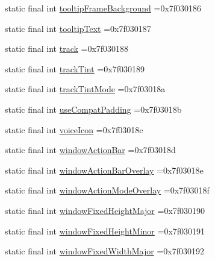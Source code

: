 \begin{DoxyCompactItemize}
\item 
static final int \mbox{\hyperlink{classbr_1_1unb_1_1cic_1_1mp_1_1marketmaster_1_1R_1_1attr_ae3aed9911de8e3c47c1885e8db3a3f1c}{tooltip\+Frame\+Background}} =0x7f030186
\item 
static final int \mbox{\hyperlink{classbr_1_1unb_1_1cic_1_1mp_1_1marketmaster_1_1R_1_1attr_a531b0326ef17c24a0771927cf2b5b775}{tooltip\+Text}} =0x7f030187
\item 
static final int \mbox{\hyperlink{classbr_1_1unb_1_1cic_1_1mp_1_1marketmaster_1_1R_1_1attr_ac1260a2b26abc0b62252a76fcb26e799}{track}} =0x7f030188
\item 
static final int \mbox{\hyperlink{classbr_1_1unb_1_1cic_1_1mp_1_1marketmaster_1_1R_1_1attr_a2a36e9079949feb5dbd0d19c1a49a868}{track\+Tint}} =0x7f030189
\item 
static final int \mbox{\hyperlink{classbr_1_1unb_1_1cic_1_1mp_1_1marketmaster_1_1R_1_1attr_aa15d3dab8bd8c47572e705b31a6fd0cb}{track\+Tint\+Mode}} =0x7f03018a
\item 
static final int \mbox{\hyperlink{classbr_1_1unb_1_1cic_1_1mp_1_1marketmaster_1_1R_1_1attr_a6e539db7f55699a9367e6ddb46f08a3c}{use\+Compat\+Padding}} =0x7f03018b
\item 
static final int \mbox{\hyperlink{classbr_1_1unb_1_1cic_1_1mp_1_1marketmaster_1_1R_1_1attr_ada4b1fd77a416c482745c94e9c4884f0}{voice\+Icon}} =0x7f03018c
\item 
static final int \mbox{\hyperlink{classbr_1_1unb_1_1cic_1_1mp_1_1marketmaster_1_1R_1_1attr_a5e8f80ddff8b8787ba37bed09668c60d}{window\+Action\+Bar}} =0x7f03018d
\item 
static final int \mbox{\hyperlink{classbr_1_1unb_1_1cic_1_1mp_1_1marketmaster_1_1R_1_1attr_a2a9e56491a8b8db8b531f47bbb5f4c45}{window\+Action\+Bar\+Overlay}} =0x7f03018e
\item 
static final int \mbox{\hyperlink{classbr_1_1unb_1_1cic_1_1mp_1_1marketmaster_1_1R_1_1attr_a5bec7836ae9da6ef0d31f7106f8da772}{window\+Action\+Mode\+Overlay}} =0x7f03018f
\item 
static final int \mbox{\hyperlink{classbr_1_1unb_1_1cic_1_1mp_1_1marketmaster_1_1R_1_1attr_a6b4455df4964f70bcdf642dd7654900b}{window\+Fixed\+Height\+Major}} =0x7f030190
\item 
static final int \mbox{\hyperlink{classbr_1_1unb_1_1cic_1_1mp_1_1marketmaster_1_1R_1_1attr_a60a01dd87528d59659874bcf6b6794f8}{window\+Fixed\+Height\+Minor}} =0x7f030191
\item 
static final int \mbox{\hyperlink{classbr_1_1unb_1_1cic_1_1mp_1_1marketmaster_1_1R_1_1attr_ab2d5ddfa01349632ef3e8c96ac6b135b}{window\+Fixed\+Width\+Major}} =0x7f030192

\end{DoxyCompactItemize}
